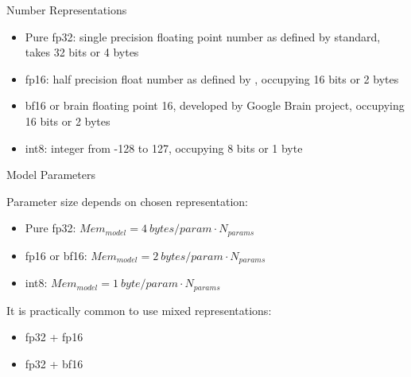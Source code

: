 
\begin{vbframe}{Number Representations}

\vfill

\begin{itemize}
 	\item Pure fp32: single precision floating point number as defined by  standard, takes 32 bits or 4 bytes
 	\item fp16: half precision float number as defined by , occupying 16 bits or 2 bytes 
    \item bf16 or brain floating point 16, developed by Google Brain project, occupying 16 bits or 2 bytes
	\item int8: integer from -128 to 127, occupying 8 bits or 1 byte
\end{itemize}

\vfill

\end{vbframe}


\begin{vbframe}{Model Parameters}

\vfill

Parameter size depends on chosen representation: \newline

\begin{itemize}
 	\item Pure fp32: $Mem_{model} = 4 ~bytes/param \cdot N_{params}$
 	\item fp16 or bf16: $Mem_{model} = 2 ~bytes/param \cdot N_{params}$
	\item int8: $Mem_{model} = 1 ~byte/param \cdot N_{params}$
\end{itemize}

\vskip8mm

It is practically common to use mixed representations: \newline

\begin{itemize}
 	\item fp32 + fp16
	\item fp32 + bf16
\end{itemize}

\vfill

\end{vbframe}

